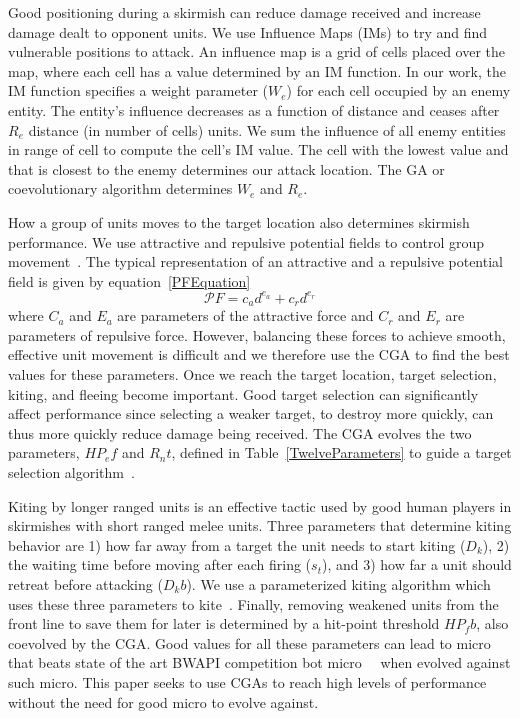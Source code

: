\documentclass[conference,10pt]{IEEEtran}
\begin{document}
Good positioning during a skirmish can reduce damage received and
increase damage dealt to opponent units. We use Influence Maps (IMs)
to try and find vulnerable positions to attack. An influence map is a
grid of cells placed over the map, where each cell has a value
determined by an IM function. In our work, the IM function specifies a
weight parameter ($W_e$) for each cell occupied by an enemy
entity. The entity’s influence decreases as a function of distance and
ceases after $R_e$ distance (in number of cells) units. We sum the influence of all enemy
entities in range of cell to compute the cell’s IM value. The cell
with the lowest value and that is closest to the enemy determines our
attack location. The GA or coevolutionary algorithm determines $W_e$
and $R_e$.

How a group of units moves to the target location also determines
skirmish performance. We use attractive and repulsive potential fields
to control group movement~\cite{vadakkepat2000evolutionary}. The typical representation of an
attractive and a repulsive potential field is given by equation~\ref{PFEquation}
\begin{equation}
\label{PFEquation}
\mathcal PF = c_ad^{e_a}+c_rd^{e_r}
\end{equation} 
where $C_a$ and $E_a$ are parameters of the attractive force and $C_r$
and $E_r$ are parameters of repulsive force. However, balancing these
forces to achieve smooth, effective unit movement is difficult and we
therefore use the CGA to find the best values for these
parameters. Once we reach the target location, target selection,
kiting, and fleeing become important. Good target selection can
significantly affect performance since selecting a weaker target, to
destroy more quickly, can thus more quickly reduce damage being
received. The CGA evolves the two parameters, $HP_ef$ and $R_nt$,
defined in Table~\ref{TwelveParameters} to guide a target selection
algorithm~\cite{EEMIRSG16}.

Kiting by longer ranged units is an effective tactic used by good
human players in skirmishes with short ranged melee units. Three
parameters that determine kiting behavior are 1) how far away from a
target the unit needs to start kiting ($D_k$), 2) the waiting time
before moving after each firing ($s_t$), and 3) how far a unit should
retreat before attacking ($D_kb$). We use a parameterized kiting
algorithm which uses these three parameters to
kite~\cite{EEMIRSG16}. Finally, removing weakened units from the front
line to save them for later is determined by a hit-point threshold
$HP_fb$, also coevolved by the CGA. Good values for all these
parameters can lead to micro that beats state of the art BWAPI
competition bot micro~\cite{RSANARC03}~\cite{EEMIRSG16} when evolved
against such micro. This paper seeks to use CGAs to reach high levels
of performance without the need for good micro to evolve against.
\end{document}
